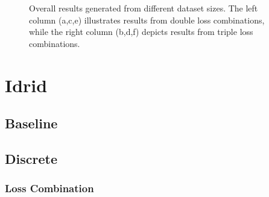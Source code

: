 \begin{figure}[H]
    \caption[Overall results for different dataset sizes]{Overall results generated from different dataset sizes. The left column (a,c,e) illustrates results from double loss combinations, while the right column (b,d,f) depicts results from triple loss combinations.}
    \label{ablation_melanoma_heatmaps}
\end{figure}
\newpage


\section{Idrid}
\label{sec:supplementary_idrid}
\subsection{Baseline}
\label{subsec:baseline_idrid}

\newpage

\subsection{Discrete}
\label{subsec:discrete_idrid}
\subsubsection*{Loss Combination}


